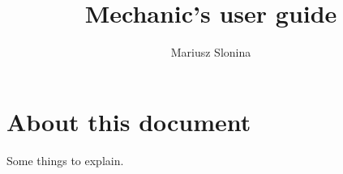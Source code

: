 \documentclass[10pt]{article}
\author{Mariusz Slonina}
\title{\bfseries Mechanic's user guide}
\begin{document}
\maketitle
{}\baselineskip
\tableofcontents
\thispagestyle{empty}
\baselineskip

\section*{About this document}
Some things to explain.


\newpage
\end{document}
